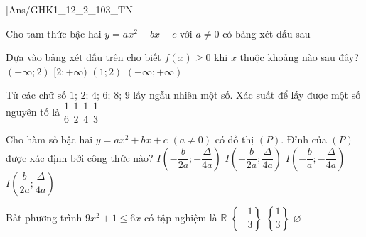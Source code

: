 \documentclass[12pt,a4paper,openany,oneside]{book}
\begin{document}
\setcounter{ex}{0}

[Ans/GHK1_12_2_103_TN]

\begin{ex}%
	Cho tam thức bậc hai $y=ax^2+bx+c$ với $a\ne  0$ có bảng xét dấu sau
	\begin{center}
	\end{center}
	Dựa vào bảng xét dấu trên cho biết $f(x)\ge  0$ khi $x$ thuộc khoảng nào sau đây?
	 \choice
		 {$(-\infty;2)$}
		 {\True  $[2;+\infty)$}
		{$( 1;2)$}
		{$(-\infty;+\infty)$} 
	\loigiai{ 
		Dựa vào bảng xét dấu, suy ra $f(x)\ge 0\Leftrightarrow x\in \left(-\infty;1\right] \cup  \left[2;+\infty\right)$.
	} 
\end{ex}

\begin{ex}%
	Từ các chữ số $1$; $2$; $4$; $6$; $8$; $9$  lấy ngẫu nhiên một số. Xác suất để lấy được một số nguyên tố là
	\choice 
		{\True $\dfrac{1}{6}$} 
		{$\dfrac{1}{2}$} 
		{$\dfrac{1}{4}$} 
		 {$\dfrac{1}{3}$}
\end{ex}

\begin{ex}%
	Cho hàm số bậc hai $y=ax^2+bx+c$ $(a \neq 0)$ có đồ thị $(P)$. Đỉnh  của $(P)$ được xác định bởi công thức nào?
	 \choice
		 {\True  $I\left(-\dfrac{b}{2a};-\dfrac{\Delta}{4a}\right)$}
		{$I\left(-\dfrac{b}{2a};\dfrac{\Delta}{4a}\right)$} 
		{$I\left(-\dfrac{b}{a};-\dfrac{\Delta}{4a}\right)$}
		{$I\left(\dfrac{b}{2a};\dfrac{\Delta}{4a}\right)$} 
\end{ex}

\begin{ex}%
	Bất phương trình  $9x^2+1\leq 6x$ có tập nghiệm là
	 \choice
		 {$\mathbb{R}$}
		{$\left\{-\dfrac{1}{3}\right\}$} 
		{\True $\left\{\dfrac{1}{3}\right\}$} 
		{$\varnothing$} 
\end{ex}
\end{document}

